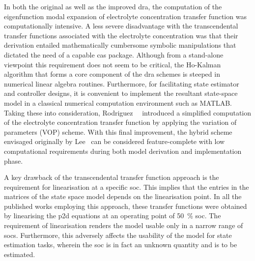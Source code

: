 In both the original  as well as the improved \gls{dra},  the computation of the
eigenfunction modal expansion of electrolyte concentration transfer function was
computationally intensive.  A less  severe disadvantage with  the transcendental
transfer  functions  associated  with  the electrolyte  concentration  was  that
their  derivation  entailed  mathematically  cumbersome  symbolic  manipulations
that  dictated  the   need  of  a  capable  \gls{cas}   package.  Although  from
a  stand-alone  viewpoint  this  requirement  does  not  seem  to  be  critical,
the  Ho-Kalman  algorithm   that  forms  a  core  component   of  the  \gls{dra}
schemes  is  steeped in  numerical  linear  algebra routines.  Furthermore,  for
facilitating  state  estimator  and  controller designs,  it  is  convenient  to
implement the resultant  state-space model in a  classical numerical computation
environment   such  as   \textsc{MATLAB}.  Taking   these  into   consideration,
Rodriguez~\etal{}~\cite{Rodriguez2017}  introduced a  simplified computation  of
the electrolyte  concentration transfer  function by  applying the  variation of
parameters  (VOP)  scheme.  With  this  final  improvement,  the  hybrid  scheme
envisaged originally by Lee~\etal{} can  be considered feature-complete with low
computational  requirements  during  both model  derivation  and  implementation
phase.


A  key  drawback  of  the  transcendental  transfer  function  approach  is  the
requirement for  linearisation at  a specific \gls{soc}.  This implies  that the
entries in  the matrices of the  state space model depends  on the linearisation
point.  In all  the  published  works employing  this  approach, these  transfer
functions were obtained  by linearising the \gls{p2d} equations  at an operating
point of  \SI{50}{\percent} \gls{soc}. The requirement  of linearisation renders
the  model usable  only  in a  narrow range  of  \glspl{soc}. Furthermore,  this
adversely affects the usability of the model for state estimation tasks, wherein
the \gls{soc} is in fact an unknown quantity and is to be estimated.


